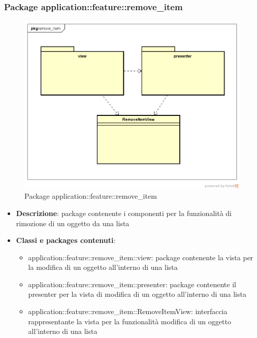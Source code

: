 \subsubsection{Package application::feature::remove\_item}
\label{Package application::feature::remove_item}
\begin{figure}[H]
	\centering
	\includegraphics[scale=0.5]{Sezioni/Packages/Application/remove_item.png}
	\caption{Package application::feature::remove\_item}
\end{figure}
\begin{itemize}
	\item \textbf{Descrizione}: package contenente i componenti per la funzionalità di rimozione di un oggetto da una lista
	\item \textbf{Classi e packages contenuti}:
	\begin{itemize}
	\item application::feature::remove\_item::view: package contenente la vista per la modifica di un oggetto all'interno di una lista
	\item application::feature::remove\_item::presenter: package contenente il presenter per la vista di modifica di un oggetto all'interno di una lista
	\item application::feature::remove\_item::RemoveItemView: interfaccia rappresentante la vista per la funzionalità modifica di un oggetto all'interno di una lista
	\end{itemize}
\end{itemize}

